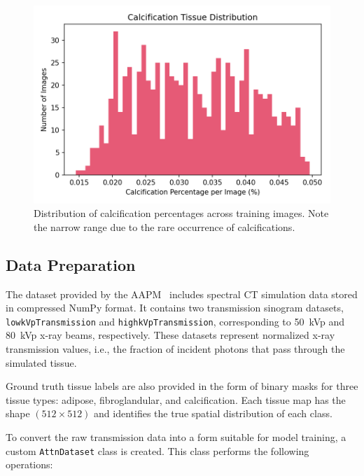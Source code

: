 \begin{figure}[h!]
    \centering
    \includegraphics[width=\linewidth]{../fig/calcification_distribution.png}
    \caption{Distribution of calcification percentages across training images. Note the narrow range due to the rare occurrence of calcifications.}
    \label{fig:calcification}
\end{figure}



\subsection{Data Preparation}\label{sec:data_preparation}

The dataset provided by the AAPM~\cite{AAPM2024SpectralCT} includes spectral CT simulation data stored 
in compressed NumPy format. It contains two transmission sinogram datasets, \texttt{lowkVpTransmission} 
and \newline \texttt{highkVpTransmission}, corresponding to 50~kVp and 80~kVp x-ray beams, respectively. These 
datasets represent normalized x-ray transmission values, i.e., the fraction of incident photons that 
pass through the simulated tissue.

Ground truth tissue labels are also provided in the form of binary masks for three tissue types: adipose, 
fibroglandular, and calcification. Each tissue map has the shape $(512 \times 512)$ and identifies the 
true spatial distribution of each class.

To convert the raw transmission data into a form suitable for model training, a custom \texttt{AttnDataset} 
class is created. This class performs the following operations:

